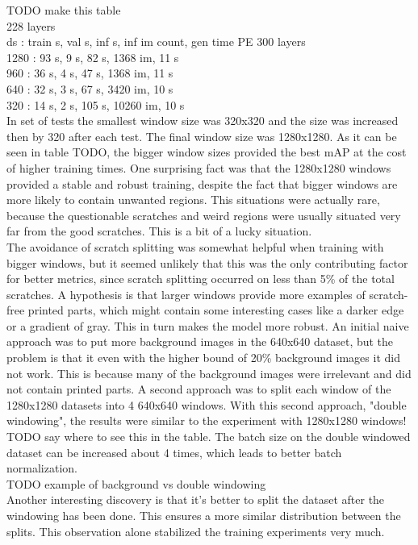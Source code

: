 TODO make this table \\
228 layers \\
ds : train s, val s, inf s, inf im count, gen time PE 300 layers \\
1280 : 93 s, 9 s, 82 s, 1368 im, 11 s \\
960 : 36 s, 4 s, 47 s, 1368 im, 11 s \\
640 : 32 s, 3 s, 67 s, 3420 im, 10 s \\
320 : 14 s, 2 s, 105 s, 10260 im, 10 s \\

In set of tests the smallest window size was 320x320 and the size was increased then by 320 after each test. The final window size was 1280x1280. As it can be seen in table TODO, the bigger window sizes provided the best mAP at the cost of higher training times. One surprising fact was that the 1280x1280 windows provided a stable and robust training, despite the fact that bigger windows are more likely to contain unwanted regions. This situations were actually rare, because the questionable scratches and weird regions were usually situated very far from the good scratches. This is a bit of a lucky situation. \\
The avoidance of scratch splitting was somewhat helpful when training with bigger windows, but it seemed unlikely that this was the only contributing factor for better metrics, since scratch splitting occurred on less than 5\% of the total scratches. A hypothesis is that larger windows provide more examples of scratch-free printed parts, which might contain some interesting cases like a darker edge or a gradient of gray. This in turn makes the model more robust. An initial naive approach was to put more background images in the 640x640 dataset, but the problem is that it even with the higher bound of 20\% background images it did not work. This is because many of the background images were irrelevant and did not contain printed parts. A second approach was to split each window of the 1280x1280 datasets into 4 640x640 windows. With this second approach, "double windowing", the results were similar to the experiment with 1280x1280 windows! TODO say where to see this in the table. The batch size on the double windowed dataset can be increased about 4 times, which leads to better batch normalization. \\

TODO example of background vs double windowing \\

Another interesting discovery is that it's better to split the dataset after the windowing has been done. This ensures a more similar distribution between the splits. This observation alone stabilized the training experiments very much. \\




